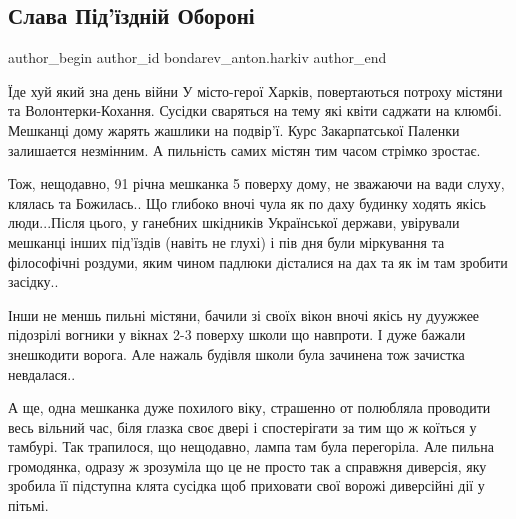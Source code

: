  
 
 
 
 
 
\subsection{Слава Під'їздній Обороні}
\label{sec:30_03_2022.fb.bondarev_anton.harkiv.1.slava_oboroni_podjezd}
 
\ifcmt
 author_begin
   author_id bondarev_anton.harkiv
 author_end
\fi

Їде хуй який зна день війни У місто-герої Харків, повертаються потроху містяни
та  Волонтерки-Кохання. Сусідки сваряться на тему які квіти саджати на клюмбі.
Мешканці дому жарять жашлики на подвір'ї. Курс Закарпатської Паленки залишается
незмінним. А пильність самих містян тим часом  стрімко зростає.


Тож, нещодавно, 91 річна мешканка 5 поверху дому, не зважаючи на вади слуху,
клялась та Божилась.. Що глибоко вночі чула як по даху будинку ходять якісь
люди...Після цього, у ганебних шкідників Української держави, увірували
мешканці інших під'їздів (навіть не глухі) і пів дня були міркування та
філософічні роздуми, яким чином падлюки дісталися на дах та як ім там зробити
засідку..

Інши не меншь пильні містяни, бачили зі своїх вікон вночі якісь ну дуужжее
підозрілі  вогники у вікнах 2-3 поверху школи що навпроти. І дуже бажали
знешкодити ворога. Але нажаль будівля школи була зачинена тож зачистка
невдалася..

А ще, одна мешканка дуже похилого віку, страшенно от полюбляла проводити весь
вільний час, біля глазка своє двері і спостерігати за тим що ж коїться у
тамбурі. Так трапилося, що нещодавно, лампа там була  перегоріла. Але пильна
громодянка, одразу ж  зрозуміла що це не просто так а справжня диверсія, яку
зробила її підступна клята сусідка щоб приховати свої ворожі диверсійні дії у
пітьмі.

